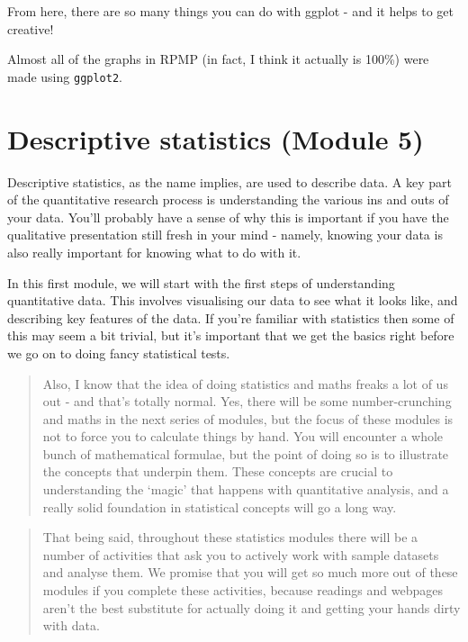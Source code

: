 \documentclass[
]{book}
\begin{document}
From here, there are so many things you can do with ggplot - and it helps to get creative!

Almost all of the graphs in RPMP (in fact, I think it actually is 100\%) were made using \texttt{ggplot2}.

\hypertarget{descriptive-statistics-module-5}{%
\chapter{Descriptive statistics (Module 5)}\label{descriptive-statistics-module-5}}

Descriptive statistics, as the name implies, are used to describe data. A key part of the quantitative research process is understanding the various ins and outs of your data. You'll probably have a sense of why this is important if you have the qualitative presentation still fresh in your mind - namely, knowing your data is also really important for knowing what to do with it.

In this first module, we will start with the first steps of understanding quantitative data. This involves visualising our data to see what it looks like, and describing key features of the data. If you're familiar with statistics then some of this may seem a bit trivial, but it's important that we get the basics right before we go on to doing fancy statistical tests.

\begin{quote}
Also, I know that the idea of doing statistics and maths freaks a lot of us out - and that's totally normal. Yes, there will be some number-crunching and maths in the next series of modules, but the focus of these modules is not to force you to calculate things by hand. You will encounter a whole bunch of mathematical formulae, but the point of doing so is to illustrate the concepts that underpin them. These concepts are crucial to understanding the `magic' that happens with quantitative analysis, and a really solid foundation in statistical concepts will go a long way.
\end{quote}

\begin{quote}
That being said, throughout these statistics modules there will be a number of activities that ask you to actively work with sample datasets and analyse them. We promise that you will get so much more out of these modules if you complete these activities, because readings and webpages aren't the best substitute for actually doing it and getting your hands dirty with data.
\end{quote}
\end{document}
